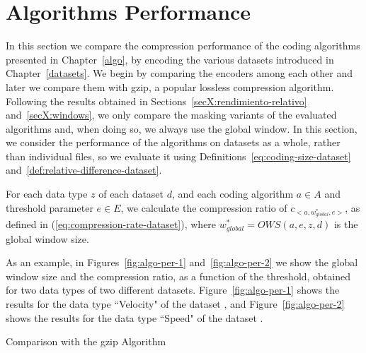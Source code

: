 
\clearpage
\section{Algorithms Performance}
\label{secX:codersmask}


In this section we compare the compression performance of the coding algorithms presented in Chapter~\ref{algo}, by encoding the various datasets introduced in Chapter~\ref{datasets}. We begin by comparing the encoders among each other and later we compare them with gzip, a popular lossless compression algorithm. Following the results obtained in Sections~\ref{secX:rendimiento-relativo} and~\ref{secX:windows}, we only compare the masking variants of the evaluated algorithms and, when doing so, we always use the global window. In this section, we consider the performance of the algorithms on datasets as a whole, rather than individual files, so we evaluate it using Definitions~\ref{eq:coding-size-dataset} and~\ref{def:relative-difference-dataset}.


For each data type $z$ of each dataset $d$, and each coding algorithm $a \in A$ and threshold parameter $e \in E$, we calculate the compression ratio of $c_{<a, w_{global}^{*}, e>}$, as defined in (\ref{eq:compression-rate-dataset}), where $w_{global}^{*}=OWS(a, e, z, d)$ is the global window size.


\vspace{+2pt}
As an example, in Figures~\ref{fig:algo-per-1} and~\ref{fig:algo-per-2} we show the global window size and the compression ratio, as a function of the threshold, obtained for two data types of two different datasets. Figure~\ref{fig:algo-per-1} shows the results for the data type ``Velocity" of the dataset \datasetadcp, and Figure~\ref{fig:algo-per-2} shows the results for the data type ``Speed" of the dataset \datasetwind. 


\clearpage


\clearpage



\clearpage

Comparison with the gzip Algorithm

\clearpage


